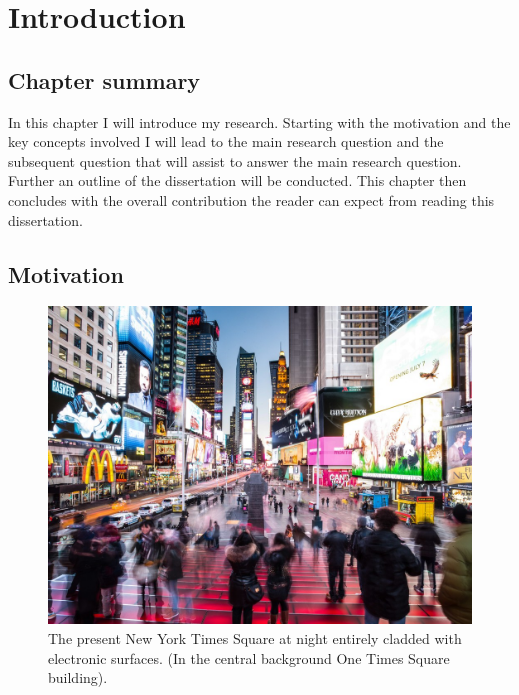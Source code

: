 

\chapter{Introduction}

\label{chapterlabel2}

\section*{Chapter summary} 

In this chapter I will introduce my research. Starting with the motivation and the key concepts involved I will lead to the main research question and the subsequent question that will assist to answer the main research question. Further an outline of the dissertation will be conducted. This chapter then concludes with the overall contribution the reader can expect from reading this dissertation.\newpage



\section{Motivation}


\begin{figure}[!b] 
\centering
\includegraphics[width=\textwidth]{Illustrations/TimesSquare.jpg}
\caption [New York Times Square in 20XX] {The present New York Times Square at night entirely cladded with electronic surfaces. (In the central background One Times Square building).}
\label{TimesSquare}
\end{figure}

